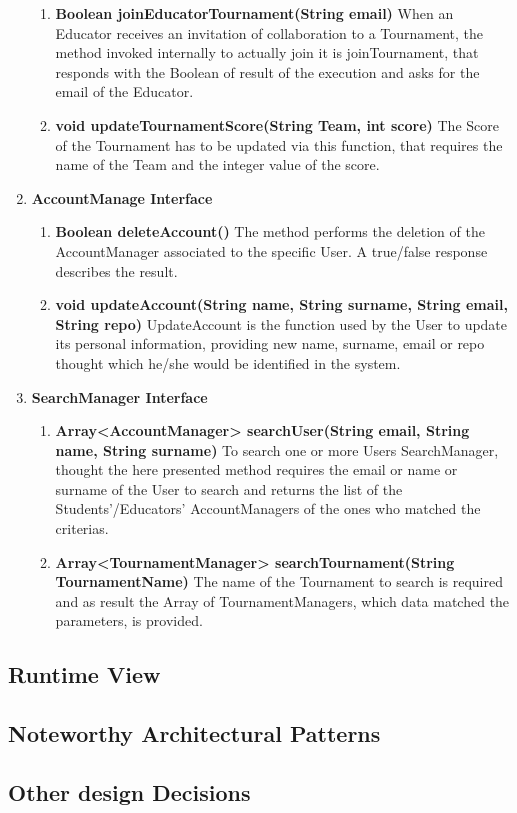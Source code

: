 \begin{enumerate}
\begin{enumerate}[label=$\bullet$]
        \item \textbf{Boolean joinEducatorTournament(String email)} When an Educator receives an invitation of collaboration to a Tournament, the method invoked internally to actually join it is joinTournament, that responds with the Boolean of result of the execution and asks for the email of the Educator.
        \item \textbf{void updateTournamentScore(String Team, int score)} The Score of the Tournament has to be updated via this function, that requires the name of the Team and the integer value of the score.
        \end{enumerate}
    \item \textbf{AccountManage Interface} 
        \begin{enumerate}[label=$\bullet$]
            \item \textbf{Boolean deleteAccount()} The method performs the deletion of the AccountManager associated to the specific User. A true/false response describes the result.
            \item \textbf{void updateAccount(String name, String surname, String email, String repo)} UpdateAccount is the function used by the User to update its personal information, providing new name, surname, email or repo thought which he/she would be identified in the system.
        \end{enumerate}
    \item \textbf{SearchManager Interface} 
        \begin{enumerate}[label=$\bullet$]
            \item \textbf{Array<AccountManager> searchUser(String email, String name, String surname)} To search one or more Users SearchManager, thought the here presented method requires the email or name or surname of the User to search and returns the list of the Students'/Educators' AccountManagers of the ones who matched the criterias.
            \item \textbf{Array<TournamentManager> searchTournament(String TournamentName)} The name of the Tournament to search is required and as result the Array of TournamentManagers, which data matched the parameters, is provided.
        \end{enumerate}
\end{enumerate}
\subsection{Runtime View}
\subsection{Noteworthy Architectural Patterns}
\subsection{Other design Decisions}